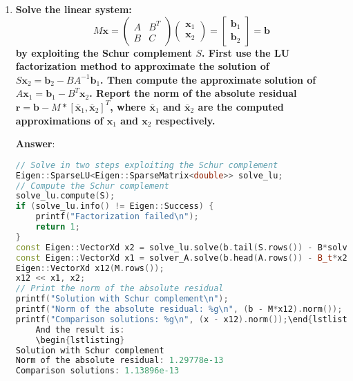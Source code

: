 \begin{enumerate}[label=\textcolor{Green3}{\textbf{\arabic*.}}]
    \newpage

    \item \textcolor{Green3}{\textbf{%
        Solve the linear system:
    }
    \begin{equation*}
        M\mathbf{x} = \begin{pmatrix}
            A & B^{T} \\ B & C
        \end{pmatrix}
        \begin{pmatrix}
            \mathbf{x}_{1} \\ \mathbf{x}_{2}
        \end{pmatrix}
        =
        \begin{bmatrix}
            \mathbf{b}_{1} \\ \mathbf{b}_{2}
        \end{bmatrix}
        =
        \mathbf{b}
    \end{equation*}
    \textbf{by exploiting the Schur complement $S$. First use the LU factorization method to approximate the solution of $S\mathbf{x}_{2} = \mathbf{b}_{2} - BA^{-1}\mathbf{b}_{1}$. Then compute the approximate solution of $A\mathbf{x}_{1} = \mathbf{b}_{1} - B^{T}\mathbf{x}_{2}$. Report the norm of the absolute residual $\mathbf{r} = \mathbf{b} - M * \left[\overline{\mathbf{x}}_{1}, \overline{\mathbf{x}}_{2}\right]^{T}$, where $\overline{\mathbf{x}}_{1}$ and $\overline{\mathbf{x}}_{2}$ are the computed approximations of $\mathbf{x}_{1}$ and $\mathbf{x}_{2}$ respectively.}
    }

    \textbf{Answer}:
    \begin{lstlisting}[language=C++]
// Solve in two steps exploiting the Schur complement
Eigen::SparseLU<Eigen::SparseMatrix<double>> solve_lu;
// Compute the Schur complement
solve_lu.compute(S);
if (solve_lu.info() != Eigen::Success) {
    printf("Factorization failed\n");
    return 1;
}
const Eigen::VectorXd x2 = solve_lu.solve(b.tail(S.rows()) - B*solver_A.solve(b.head(A.rows())));
const Eigen::VectorXd x1 = solver_A.solve(b.head(A.rows()) - B_t*x2);
Eigen::VectorXd x12(M.rows());
x12 << x1, x2;
// Print the norm of the absolute residual
printf("Solution with Schur complement\n");
printf("Norm of the absolute residual: %g\n", (b - M*x12).norm());
printf("Comparison solutions: %g\n", (x - x12).norm());\end{lstlisting}
    And the result is:
    \begin{lstlisting}
Solution with Schur complement
Norm of the absolute residual: 1.29778e-13
Comparison solutions: 1.13896e-13\end{lstlisting}
\end{enumerate}